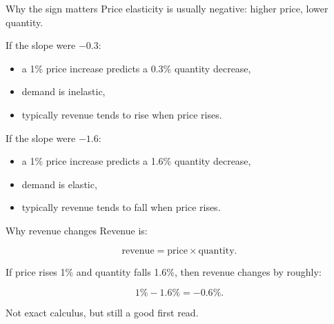 \documentclass[
  ignorenonframetext,
  aspectratio=43,
]{beamer}
\providecommand{\tightlist}{%
  \setlength{\itemsep}{0pt}\setlength{\parskip}{0pt}}\usepackage{longtable,booktabs,array}
\begin{document}
\begin{frame}{Why the sign matters}
\label{why-the-sign-matters}
Price elasticity is usually negative: higher price, lower quantity.

If the slope were \(-0.3\):

\begin{itemize}
\tightlist
\item
  a 1\% price increase predicts a 0.3\% quantity decrease,
\item
  demand is inelastic,
\item
  typically revenue tends to rise when price rises.
\end{itemize}

If the slope were \(-1.6\):

\begin{itemize}
\tightlist
\item
  a 1\% price increase predicts a 1.6\% quantity decrease,
\item
  demand is elastic,
\item
  typically revenue tends to fall when price rises.
\end{itemize}
\end{frame}

\begin{frame}{Why revenue changes}
\label{why-revenue-changes}
Revenue is:

\[
\text{revenue} = \text{price} \times \text{quantity}.
\]

If price rises 1\% and quantity falls 1.6\%, then revenue changes by
roughly:

\[
1\% - 1.6\% = -0.6\%.
\]

Not exact calculus, but still a good first read.
\end{frame}
\end{document}
